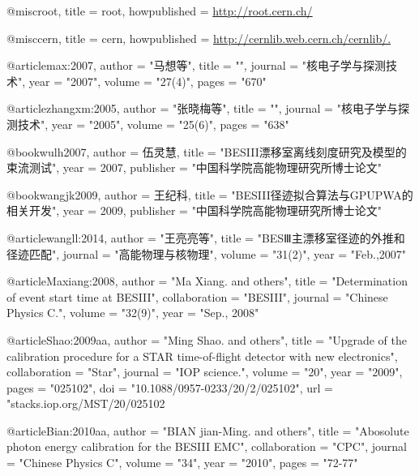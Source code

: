 @misc{root,
      title          = {root},
      howpublished   = {\url{http://root.cern.ch/}}
}

@misc{cern,
      title          = {cern},
      howpublished   = {\url{http://cernlib.web.cern.ch/cernlib/.}}
}

@article{max:2007,
      author         = "马想等",
      title          = "{}",
      journal        = "核电子学与探测技术",
      year           = "2007",
      volume         = "27(4)",
      pages          = "670"
}

@article{zhangxm:2005,
      author         = "张晓梅等",
      title          = "{}",
      journal        = "核电子学与探测技术",
      year           = "2005",
      volume         = "25(6)",
      pages          = "638"
}

@book{wulh2007,
      author = {{伍灵慧}},
      title = "{BESIII漂移室离线刻度研究及模型的束流测试}",
      year = {2007},
      publisher = "中国科学院高能物理研究所博士论文"
}

@book{wangjk2009,
      author = {{王纪科}},
      title = "{BESIII径迹拟合算法与GPUPWA的相关开发}",
      year = {2009},
      publisher = "中国科学院高能物理研究所博士论文"
}

@article{wangll:2014,
      author         = "王亮亮等",
      title          = "{BESⅢ主漂移室径迹的外推和径迹匹配}",
      journal        = "高能物理与核物理",
	  volume         = "31(2)",
      year           = "Feb.,2007"
}

@article{Maxiang:2008,
      author         = "Ma Xiang. and others",
      title          = "{Determination of event start time at BESIII}",
      collaboration  = "BESIII",
      journal        = "Chinese Physics C.",
      volume         = "32(9)",
      year           = "Sep., 2008"
}

@article{Shao:2009aa,
      author         = "Ming Shao. and others",
      title          = "{Upgrade of the calibration procedure for a STAR time-of-flight detector with new electronics}",
      collaboration  = "Star",
      journal        = "IOP science.",
      volume         = "20",
      year           = "2009",
      pages          = "025102",
      doi            = "10.1088/0957-0233/20/2/025102",
      url            = "stacks.iop.org/MST/20/025102
}

@article{Bian:2010aa,
      author         = "BIAN jian-Ming. and others",
      title          = "{Abosolute photon energy calibration for the BESIII EMC}",
      collaboration  = "CPC",
      journal        = "Chinese Physics C",
      volume         = "34",
      year           = "2010",
      pages          = "72-77"
}

